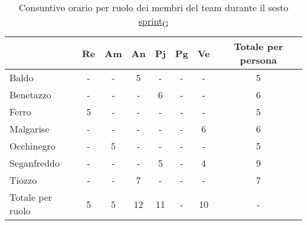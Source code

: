 \begin{table}[!h]
    \centering
    \begin{tabular}{ | l | c | c | c | c | c | c | c | }
        \hline
        \textbf{} & \textbf{Re} & \textbf{Am} &\textbf{An} & \textbf{Pj} & \textbf{Pg} & \textbf{Ve} & \textbf{Totale per persona} \\
        \hline
        Baldo            &  -   &  -   &  5   &  -   &  -   &  -   &  5   \\
        Benetazzo        &  -   &  -   &  -   &  6   &  -   &  -   &  6   \\
        Ferro            &  5   &  -   &  -   &  -   &  -   &  -   &  5   \\
        Malgarise        &  -   &  -   &  -   &  -   &  -   &  6   &  6   \\
        Occhinegro       &  -   &  5   &  -   &  -   &  -   &  -   &  5   \\
        Seganfreddo      &  -   &  -   &  -   &  5   &  -   &  4   &  9   \\
        Tiozzo           &  -   &  -   &  7   &  -   &  -   &  -   &  7   \\
        \hline
        Totale per ruolo &  5   &  5   &  12   &  11   &  -   &  10   &  -   \\
        \hline
    \end{tabular}
    \caption{Consuntivo orario per ruolo dei membri del team durante il sesto \href{https://7last.github.io/docs/rtb/documentazione-interna/glossario\#sprint}{sprint\textsubscript{G}}} %
\end{table}

